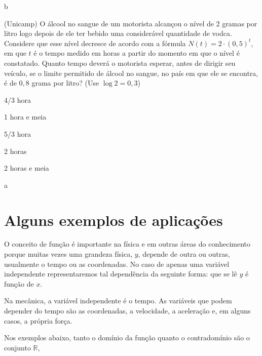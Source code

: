 \documentclass[../main.tex]{subfiles}
\begin{document}
\begin{resp}
b
\end{resp}
\begin{exer}
(Unicamp) O álcool no sangue de um motorista alcançou o nível de 2 gramas por litro logo depois de ele ter bebido uma considerável quantidade de vodca. Considere que esse nível decresce de acordo com a fórmula $N(t) = 2\cdot (0,5)^t$, em que $t$ é o tempo medido em horas a partir do momento em que o nível é constatado. Quanto tempo deverá o motorista esperar, antes de dirigir seu veículo, se o limite permitido de álcool no sangue, no país em que ele se encontra, é de $0,8$ grama por litro? (Use $\log 2 = 0,3$)
\begin{multicols}{3}
\begin{compactenum}[a)]
\item 4/3 hora\item  1 hora e meia\item  5/3 hora\item  2 horas\item 2 horas e meia
\end{compactenum}
\end{multicols}
\end{exer}
\begin{resp}
a
\end{resp}

\section{Alguns exemplos de aplicações}\label{sec:Func-Aplicacoes}
O conceito de função é importante na física e em outras áreas do conhecimento porque muitas vezes uma grandeza física,  $y$, depende de outra ou outras, usualmente o tempo ou as coordenadas. No caso de apenas uma variável independente representaremos tal dependência da seguinte forma:
que se lê  $y$ é função de  $x$.

Na mecânica, a variável independente é o tempo. As variáveis que podem depender do 
tempo são as coordenadas, a velocidade, a aceleração e, em alguns casos, a própria força.

Nos exemplos abaixo, tanto o domínio da função quanto o contradomínio são o conjunto $\mathbb{R}$,  
\end{document}
